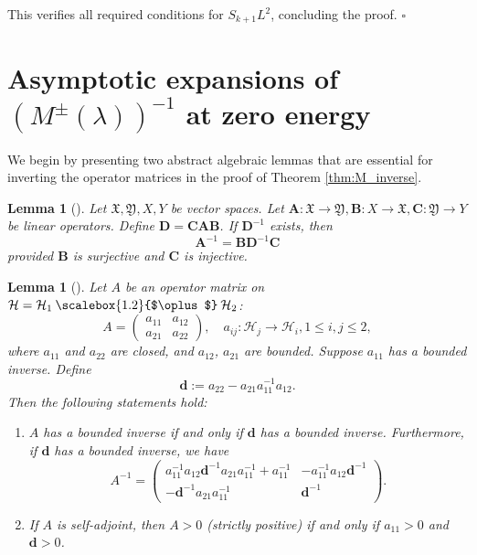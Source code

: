 \documentclass[reqno]{amsart}
\newtheorem{lemma}[theorem]{Lemma}
\newcommand{\medoplus}
{\mathbin{\scalebox{1.2}{$\oplus$}}}
\numberwithin{equation}{section}
\begin{document}
This verifies all required conditions for $S_{{k}+1}L^2$, concluding the proof.
\hfill $\square$

\section{Asymptotic expansions of $(M^{\pm}(\lambda))^{-1}$ at zero energy}
\label{subsec:proof_inverse}

We begin by presenting two abstract algebraic lemmas that are essential for inverting the operator matrices in the proof of Theorem \ref{thm:M_inverse}.

\begin{lemma}[{\cite[Lemma 3.12]{JK}}]\label{lemma_1}
	Let $\mathfrak{X}, \mathfrak{Y}, X, Y$ be vector spaces. Let $\mathbf{A} : \mathfrak{X} \rightarrow \mathfrak{Y}, \mathbf{B} : X \rightarrow \mathfrak{X}, \mathbf{C} : \mathfrak{Y} \rightarrow Y$ be linear operators. Define $\mathbf{D}=\mathbf{C}\mathbf{A}\mathbf{B}$. If $\mathbf{D}^{-1}$ exists, then
	$$
\mathbf{A}^{-1}=\mathbf{B}\mathbf{D}^{-1}\mathbf{C}
	$$
	provided $\mathbf{B}$ is surjective and $\mathbf{C}$ is injective.
\end{lemma}

\begin{lemma}[{\cite[Lemma 2.3]{JN}}]\label{lemma_2}
	Let $A$ be an operator matrix on $\mathcal{H}=\mathcal{H}_1 \medoplus \mathcal{H}_2$:
	$$
	A=\left(\begin{array}{ll}
		a_{11} & a_{12} \\
		a_{21} & a_{22}
	\end{array}\right), \quad a_{i j}: \mathcal{H}_j \rightarrow \mathcal{H}_i, 1 \leq i, j \leq 2,
	$$
	where $a_{11}$ and $a_{22}$ are closed, and $a_{12}$, $a_{21}$ are bounded. Suppose $a_{11}$ has a bounded inverse. Define 
	$$
	\boldsymbol{d} := a_{22}-a_{21} a_{11}^{-1} a_{12}.
	$$
	Then the following statements hold:
	\begin{enumerate}
		\item[(i)] $A$ has a bounded inverse if and only if $\boldsymbol{d}$
		has a bounded inverse. Furthermore, if $\boldsymbol{d}$ has a bounded inverse, we have
		\begin{equation}\label{A-m}
		A^{-1}=\left(\begin{array}{cc}
			a_{11}^{-1} a_{12} \boldsymbol{d}^{-1} a_{21} a_{11}^{-1}+a_{11}^{-1} & -a_{11}^{-1} a_{12} \boldsymbol{d}^{-1}  \\
			-\boldsymbol{d}^{-1} a_{21} a_{11}^{-1}& \boldsymbol{d}^{-1}
		\end{array}\right) .
		\end{equation}
		\item[(ii)] If $A$ is self-adjoint, then $A > 0$ (strictly positive) if and only if $a_{11} > 0$ and $\boldsymbol{d} > 0$.
	\end{enumerate}
\end{lemma}
\end{document}
